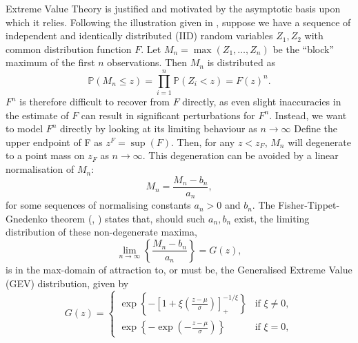 \documentclass{article}
\numberwithin{equation}{section}
\begin{document}
Extreme Value Theory is justified and motivated by the asymptotic basis upon which it relies.
Following the illustration given in \cite{Coles2001}, suppose we have a sequence of independent and identically distributed (IID) random variables $Z_1, Z_2$ with common distribution function $F$. 
Let $M_n = \max(Z_1, \ldots, Z_n)$ be the ``block'' maximum of the first $n$ observations. 
Then $M_n$ is distributed as
\[
  \mathbb{P}(M_n \le z) = \prod_{i = 1}^{n}{\mathbb{P}(Z_i < z)} = {F(z)}^n.
\]
$F^n$ is therefore difficult to recover from $F$ directly, as even slight inaccuracies in the estimate of $F$ can result in significant perturbations for $F^n$.
Instead, we want to model $F^n$ directly by looking at its limiting behaviour as $n \to \infty$%
Define the upper endpoint of F as $z^F = \sup(F)$. 
Then, for any $z < z_F$, $M_n$ will degenerate to a point mass on $z_F$ as $n \to \infty$.
This degeneration can be avoided by a linear normalisation of $M_n$:
\begin{equation}
  M_n = \frac{M_n - b_n}{a_n},
\end{equation}
for some sequences of normalising constants $a_n > 0$ and $b_n$. 
The Fisher-Tippet-Gnedenko theorem (\cite{Fisher1928}, \cite{Gnedenko1943}) states that, should such $a_n, b_n$ exist, the limiting distribution of these non-degenerate maxima,
\begin{equation} \label{eq:uni_limiting_dist}
  \lim_{n \to \infty}\left\{\frac{M_n - b_n}{a_n}\right\} = G(z),
\end{equation}
is in the max-domain of attraction to, or must be, the Generalised Extreme Value (GEV) distribution, given by 
\begin{equation} \label{eq:gev}
  G(z) = \begin{cases}
    \exp\left\{-\left[1 + \xi\left(\frac{z - \mu}{\sigma}\right)\right]_+^{-1/\xi}\right\} & \text{if } \xi \ne 0, \\
    \exp\left\{-\exp\left(-\frac{z - \mu}{\sigma}\right)\right\} & \text{if } \xi = 0,
  \end{cases}
\end{equation}
\end{document}
